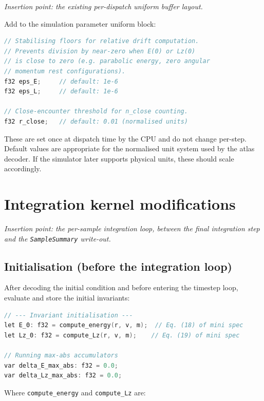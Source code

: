 \documentclass[11pt]{article}
\newcommand{\struct}[1]{\texttt{#1}}
\begin{document}
\textit{Insertion point: the existing per-dispatch uniform buffer layout.}

Add to the simulation parameter uniform block:

\begin{lstlisting}[language=C]
// Stabilising floors for relative drift computation.
// Prevents division by near-zero when E(0) or Lz(0)
// is close to zero (e.g. parabolic energy, zero angular
// momentum rest configurations).
f32 eps_E;     // default: 1e-6
f32 eps_L;     // default: 1e-6

// Close-encounter threshold for n_close counting.
f32 r_close;   // default: 0.01 (normalised units)
\end{lstlisting}

These are set once at dispatch time by the CPU and do not change per-step.
Default values are appropriate for the normalised unit system used by the atlas
decoder. If the simulator later supports physical units, these should scale
accordingly.

\section{Integration kernel modifications}
\label{sec:kernel}

\textit{Insertion point: the per-sample integration loop, between the final
integration step and the \struct{SampleSummary} write-out.}

\subsection{Initialisation (before the integration loop)}

After decoding the initial condition and before entering the timestep loop,
evaluate and store the initial invariants:

\begin{lstlisting}[language=C]
// --- Invariant initialisation ---
let E_0: f32 = compute_energy(r, v, m);  // Eq. (18) of mini spec
let Lz_0: f32 = compute_Lz(r, v, m);    // Eq. (19) of mini spec

// Running max-abs accumulators
var delta_E_max_abs: f32 = 0.0;
var delta_Lz_max_abs: f32 = 0.0;
\end{lstlisting}

Where \texttt{compute\_energy} and \texttt{compute\_Lz} are:
\end{document}
